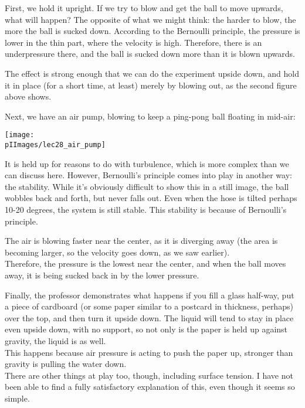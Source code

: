 First, we hold it upright. If we try to blow and get the ball to move upwards, what will happen? The opposite of what we might think: the harder to blow, the more the ball is sucked down. According to the Bernoulli principle, the pressure is lower in the thin part, where the velocity is high. Therefore, there is an underpressure there, and the ball is sucked down more than it is blown upwards.

The effect is strong enough that we can do the experiment upside down, and hold it in place (for a short time, at least) merely by blowing out, as the second figure above shows.

Next, we have an air pump, blowing to keep a ping-pong ball floating in mid-air:

\begin{center}
\texttt{[image: \\pIImages/lec28\_air\_pump]}
\end{center}

It is held up for reasons to do with turbulence, which is more complex than we can discuss here. However, Bernoulli's principle comes into play in another way: the stability. While it's obviously difficult to show this in a still image, the ball wobbles back and forth, but never falls out. Even when the hose is tilted perhaps 10-20 degrees, the system is still stable. This stability is because of Bernoulli's principle.

\begin{figure}[H]
\centering
{}
\end{figure}


The air is blowing faster near the center, as it is diverging away (the area is becoming larger, so the velocity goes down, as we saw earlier).\\
Therefore, the pressure is the lowest near the center, and when the ball moves away, it is being sucked back in by the lower pressure.

Finally, the professor demonstrates what happens if you fill a glass half-way, put a piece of cardboard (or some paper similar to a postcard in thickness, perhaps) over the top, and then turn it upside down. The liquid will tend to stay in place even upside down, with no support, so not only is the paper is held up against gravity, the liquid is as well.\\
This happens because air pressure is acting to push the paper up, stronger than gravity is pulling the water down.\\
There are other things at play too, though, including surface tension. I have not been able to find a fully satisfactory explanation of this, even though it seems so simple.


